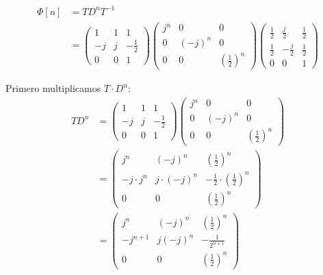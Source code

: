 \documentclass[
  11pt,
  letterpaper,
   addpoints,
   answers
  ]{exam}
\begin{document}
\begin{questions}
\begin{solution}
\begin{align}
  \Phi[n] &= T D^n T^{-1} \\
  &= \begin{pmatrix} 1 & 1 & 1 \\ -j & j & -\frac{1}{2} \\ 0 & 0 & 1 \end{pmatrix} \begin{pmatrix} j^n & 0 & 0 \\ 0 & (-j)^n & 0 \\ 0 & 0 & \left(\frac{1}{2}\right)^n \end{pmatrix} \begin{pmatrix} \frac{1}{2} & \frac{j}{2} & \frac{1}{2} \\ \frac{1}{2} & -\frac{j}{2} & \frac{1}{2} \\ 0 & 0 & 1 \end{pmatrix}
\end{align}

Primero multiplicamos $T \cdot D^n$:
\begin{align}
  T D^n &= \begin{pmatrix} 1 & 1 & 1 \\ -j & j & -\frac{1}{2} \\ 0 & 0 & 1 \end{pmatrix} \begin{pmatrix} j^n & 0 & 0 \\ 0 & (-j)^n & 0 \\ 0 & 0 & \left(\frac{1}{2}\right)^n \end{pmatrix} \\
  &= \begin{pmatrix} j^n & (-j)^n & \left(\frac{1}{2}\right)^n \\ -j \cdot j^n & j \cdot (-j)^n & -\frac{1}{2} \cdot \left(\frac{1}{2}\right)^n \\ 0 & 0 & \left(\frac{1}{2}\right)^n \end{pmatrix} \\
  &= \begin{pmatrix} j^n & (-j)^n & \left(\frac{1}{2}\right)^n \\ -j^{n+1} & j(-j)^n & -\frac{1}{2^{n+1}} \\ 0 & 0 & \left(\frac{1}{2}\right)^n \end{pmatrix}
\end{align}


\end{solution}
\end{questions}
\end{document}
